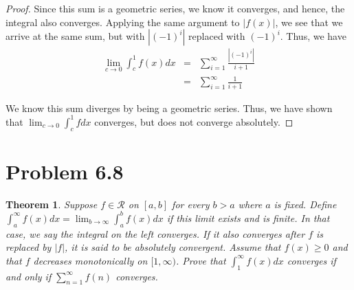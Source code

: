 \documentclass[psamsfonts]{amsart}
\newtheorem{thm}{Theorem}[section]
\theoremstyle{definition}
\theoremstyle{remark}
\numberwithin{equation}{section}
\begin{document}
\begin{proof}
Since this sum is a geometric series, we know it converges, and hence, the integral also converges. Applying the same argument to $|f(x)|$, we see that we arrive at the same sum, but with $|(-1)^i|$ replaced with $(-1)^i$. Thus, we have
\begin{eqnarray}
\lim_{c \to 0} \int_c^1 f(x) dx &=& \sum_{i=1}^\infty \frac{|(-1)^i|}{i+1} \\
&=& \sum_{i=1}^\infty \frac{1}{i+1} 
\end{eqnarray}

We know this sum diverges by being a geometric series. Thus, we have shown that $\lim_{c \to 0} \int_c^1 f dx$ converges, but does not converge absolutely. 
\end{proof}

\section{Problem 6.8}

\begin{thm}
Suppose $f \in \mathscr{R}$ on $[a,b]$ for every $b>a$ where $a$ is fixed. Define $\int_a^\infty f(x)dx = \lim_{b \to \infty} \int_a^b f(x) dx$ if this limit exists and is finite. In that case, we say the integral on the left converges. If it also converges after $f$ is replaced by $|f|$, it is said to be absolutely convergent. Assume that $f(x) \geq 0$ and that $f$ decreases monotonically on $[1,\infty)$. Prove that $\int_1^\infty f(x) dx$ converges if and only if $\sum_{n=1}^\infty f(n)$ converges.
\end{thm}
\end{document}
